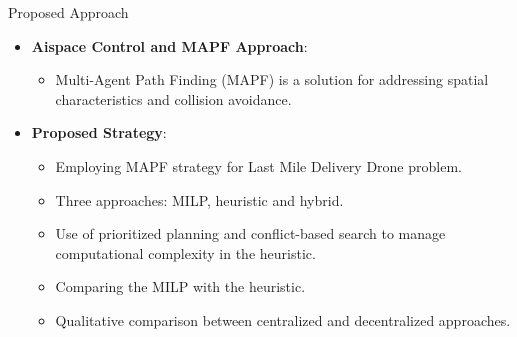 \begin{frame}{Proposed Approach}
\begin{itemize}
    \item \textbf{Aispace Control and MAPF Approach}:
    \begin{itemize}
        \item Multi-Agent Path Finding (MAPF) is a solution for addressing spatial characteristics and collision avoidance.
    \end{itemize}
    \item \textbf{Proposed Strategy}:
    \begin{itemize}
        \item Employing MAPF strategy for Last Mile Delivery Drone problem.
        \item Three approaches: MILP, heuristic and hybrid.
        \item Use of prioritized planning \cite{7138650} and conflict-based search \cite{SHARON201540} to manage computational complexity in the heuristic.
        \item Comparing the MILP with the heuristic.
        \item Qualitative comparison between centralized and decentralized approaches.
    \end{itemize}
\end{itemize}
\end{frame}


